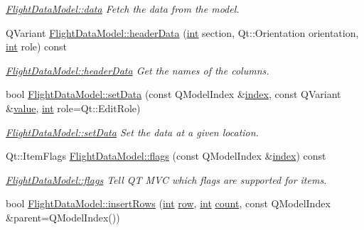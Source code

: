 \begin{DoxyCompactItemize}
\begin{DoxyCompactList}\small\item\em \hyperlink{group___path_ga3314e011bb5ed88b34ab33bf8f94d41e}{Flight\-Data\-Model\-::data} Fetch the data from the model. \end{DoxyCompactList}\item 
Q\-Variant \hyperlink{group___path_gaa4c59e9669bd77cd6475133fcf529bad}{Flight\-Data\-Model\-::header\-Data} (\hyperlink{ioapi_8h_a787fa3cf048117ba7123753c1e74fcd6}{int} section, Qt\-::\-Orientation orientation, \hyperlink{ioapi_8h_a787fa3cf048117ba7123753c1e74fcd6}{int} role) const 
\begin{DoxyCompactList}\small\item\em \hyperlink{group___path_gaa4c59e9669bd77cd6475133fcf529bad}{Flight\-Data\-Model\-::header\-Data} Get the names of the columns. \end{DoxyCompactList}\item 
bool \hyperlink{group___path_ga8931eaae5c2004c4d42233bcdad3ee4d}{Flight\-Data\-Model\-::set\-Data} (const Q\-Model\-Index \&\hyperlink{glext_8h_ab47dd9958bcadea08866b42bf358e95e}{index}, const Q\-Variant \&\hyperlink{glext_8h_aa0e2e9cea7f208d28acda0480144beb0}{value}, \hyperlink{ioapi_8h_a787fa3cf048117ba7123753c1e74fcd6}{int} role=Qt\-::\-Edit\-Role)
\begin{DoxyCompactList}\small\item\em \hyperlink{group___path_ga8931eaae5c2004c4d42233bcdad3ee4d}{Flight\-Data\-Model\-::set\-Data} Set the data at a given location. \end{DoxyCompactList}\item 
Qt\-::\-Item\-Flags \hyperlink{group___path_gaeabf907ec7c9cfc6c410c2dd6678e603}{Flight\-Data\-Model\-::flags} (const Q\-Model\-Index \&\hyperlink{glext_8h_ab47dd9958bcadea08866b42bf358e95e}{index}) const 
\begin{DoxyCompactList}\small\item\em \hyperlink{group___path_gaeabf907ec7c9cfc6c410c2dd6678e603}{Flight\-Data\-Model\-::flags} Tell Q\-T M\-V\-C which flags are supported for items. \end{DoxyCompactList}\item 
bool \hyperlink{group___path_ga17a5cd58322554d7fadb0c84031deb26}{Flight\-Data\-Model\-::insert\-Rows} (\hyperlink{ioapi_8h_a787fa3cf048117ba7123753c1e74fcd6}{int} \hyperlink{glext_8h_a11b277b422822f784ee248b43eee3e1e}{row}, \hyperlink{ioapi_8h_a787fa3cf048117ba7123753c1e74fcd6}{int} \hyperlink{glext_8h_a5b40aca7a9682963dd00a8f5aef0a901}{count}, const Q\-Model\-Index \&parent=Q\-Model\-Index())

\end{DoxyCompactItemize}
